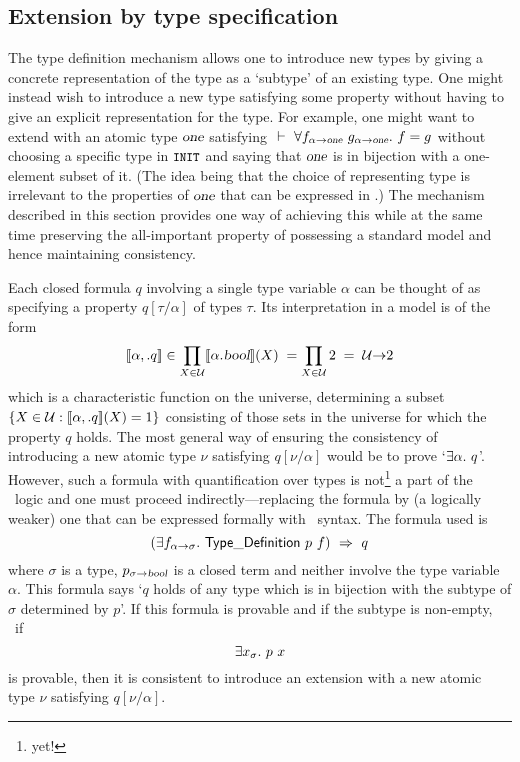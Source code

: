 \subsection{Extension by type specification\protect\footnotemark}
\label{tyspecs}
  The type definition
mechanism allows one to introduce new types by giving a concrete
representation of the type as a `subtype' of an existing type. One
might instead wish to introduce a new type satisfying some property
without having to give an explicit representation for the type. For
example, one might want to extend  with an atomic type
$\textsl{one}$ satisfying $\ \vdash\ \forall f_{\alpha{\to}\textsl{one}}\
  g_{\alpha{\to}\textsl{one}}.\ f=g$ without choosing a specific type in
$\hbox{{\small\tt INIT}}$ and saying that $\textsl{one}$ is in bijection with a
one-element subset of it. (The idea being that the choice of
representing type is irrelevant to the properties of $\textsl{one}$ that
can be expressed in \HOL.) The mechanism described in this section
provides one way of achieving this while at the same time preserving
the all-important property of possessing a standard model and hence
maintaining consistency.

Each closed formula $q$ involving a single type variable $\alpha$ can
be thought of as specifying a property $q[\tau/\alpha]$ of types
$\tau$. Its interpretation in a model is of the form
\[
[\![\alpha,.q]\!]\in \prod_{X\in{\cal U}}[\![\alpha.\textsl{bool}]\!](X)
\;= \prod_{X\in{\cal U}}\mbox{\rm 2} \;=\; {\cal U}{\to}\mbox{\rm 2}
\]
which is a characteristic function on the universe, determining a
subset $\{X\in{\cal U}:[\![\alpha,.q]\!](X)=1\}$ consisting of those
sets in the universe for which the property $q$ holds. The most
general way of ensuring the consistency of introducing a new atomic
type $\nu$ satisfying $q[\nu/\alpha]$ would be to prove
`$\exists \alpha.\ q$'. However, such a
formula with quantification over types is not\footnote{yet!} a part of
the \HOL\ logic and one must proceed indirectly---replacing the
formula by (a logically weaker) one that can be expressed formally with
\HOL\ syntax. The formula used is
\[
(\exists f_{\alpha{\to}\sigma}.\ {\sf Type\_Definition}\ p\ f)\ \Rightarrow\ q
\]
where $\sigma$ is a type, $p_{\sigma{\to}\textsl{bool}}$ is a closed term
and neither involve the type variable $\alpha$. This formula says `$q$
holds of any type which is in bijection with the subtype of $\sigma$
determined by $p$'. If this formula is provable and if the subtype is
non-empty, \ie\ if
\[
\exists x_\sigma.\ p\ x
\]
is provable, then it is consistent to introduce an extension with a new
atomic type $\nu$ satisfying $q[\nu/\alpha]$.

